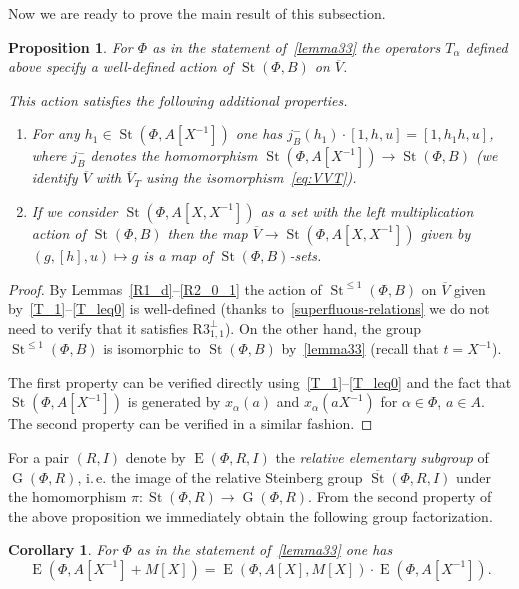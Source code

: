 \documentclass[oneside, 8pt]{amsart}
\newtheorem{prop}[lemma]{Proposition}
\newtheorem{corollary}[lemma]{Corollary}
\theoremstyle{remark}
\theoremstyle{definition}
\numberwithin{lemma}{section}
\numberwithin{prop}{section}
\numberwithin{corollary}{section}
\numberwithin{externaltheorem}{section}
\DeclareMathOperator{\St}{St}
\DeclareMathOperator{\E}{E}
\DeclareMathOperator{\GG}{G}
\newcommand{\inv}{^{-1}}
\numberwithin{equation}{section}
\begin{document}
Now we are ready to prove the main result of this subsection.
\begin{prop} \label{prop43}
For $\Phi$ as in the statement of~\cref{lemma33} the operators $T_\alpha$ defined above specify a well-defined action of $\St(\Phi, B)$ on $\overline{V}$. 

This action satisfies the following additional properties.
\begin{enumerate}
 \item For any $h_1 \in \St(\Phi, A[X\inv])$ one has $j_B^-(h_1) \cdot [1, h, u] = [1, h_1 h, u]$, where $j_B^-$ denotes the homomorphism $\St(\Phi, A[X\inv]) \to \St(\Phi, B)$ (we identify $\overline{V}$ with $\overline{V}_T$ using the isomorphism~\eqref{eq:VVT}).
 \item If we consider $\St(\Phi, A[X, X\inv])$ as a set with the left multiplication action of $\St(\Phi, B)$ then the map $\overline{V} \to \St(\Phi, A[X, X\inv])$ given by $(g, [h], u) \mapsto g$ is a map of $\St(\Phi, B)$-sets.
\end{enumerate}
\end{prop}
\begin{proof} By Lemmas~\ref{R1_d}--\ref{R2_0_1} the action of $\St^{\leq 1}(\Phi, B)$ on $\overline{V}$ given by~\eqref{T_1}--\eqref{T_leq0} is well-defined (thanks to~\cref{superfluous-relations} we do not need to verify that it satisfies $\text{R3}_{1,1}^\bot$). On the other hand, the group $\St^{\leq 1}(\Phi, B)$ is isomorphic to $\St(\Phi, B)$ by~\cref{lemma33} (recall that $t = X^{-1}$).
  
The first property can be verified directly using~\eqref{T_1}--\eqref{T_leq0} and the fact that $\St(\Phi, A[X\inv])$ is generated by $x_\alpha(a)$ and $x_\alpha(aX\inv)$ for $\alpha\in\Phi$, $a\in A$. The second property can be verified in a similar fashion. \end{proof}

For a pair $(R, I)$ denote by $\E(\Phi, R, I)$ the {\it relative elementary subgroup} of $\GG(\Phi, R)$, i.\,e.
the image of the relative Steinberg group $\overline{\St}(\Phi, R, I)$ under the homomorphism $\pi \colon \St(\Phi, R) \to \GG(\Phi, R)$.
From the second property of the above proposition we immediately obtain the following group factorization.
\begin{corollary} For $\Phi$ as in the statement of~\cref{lemma33} one has
\[\E(\Phi, A[X\inv] + M[X]) = \E(\Phi, A[X], M[X]) \cdot \E(\Phi, A[X\inv]).\] \end{corollary}
\end{document}
